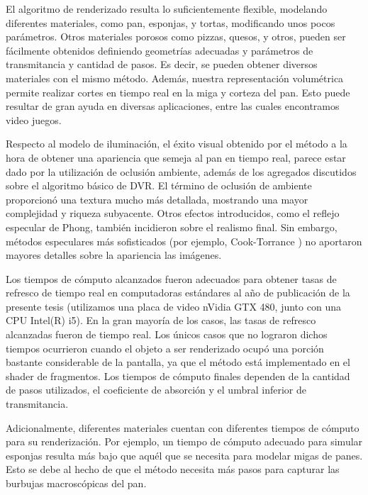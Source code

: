 El algoritmo de renderizado resulta lo suficientemente flexible, modelando diferentes materiales, como pan, esponjas, y tortas, modificando unos pocos parámetros.
Otros materiales porosos como pizzas, quesos, y otros, pueden ser fácilmente obtenidos definiendo geometrías adecuadas y parámetros de transmitancia y cantidad de pasos.
Es decir, se pueden obtener diversos materiales con el mismo método.
Además, nuestra representación volumétrica permite realizar cortes en tiempo real en la miga y corteza del pan.
Esto puede resultar de gran ayuda en diversas aplicaciones, entre las cuales encontramos video juegos.

Respecto al modelo de iluminación, el éxito visual obtenido por el método a la hora de obtener una apariencia que semeja al pan en tiempo real, parece estar dado por la utilización de oclusión ambiente, además de los agregados discutidos sobre el algoritmo básico de DVR.
El término de oclusión de ambiente proporcionó una textura mucho más detallada, mostrando una mayor complejidad y riqueza subyacente.
Otros efectos introducidos, como el reflejo especular de Phong, también incidieron sobre el realismo final.
Sin embargo, métodos especulares más sofisticados (por ejemplo, Cook-Torrance \cite{Cook1982}) no aportaron mayores detalles sobre la apariencia las imágenes.


Los tiempos de cómputo alcanzados fueron adecuados para obtener tasas de refresco de tiempo real en computadoras estándares al año de publicación de la presente tesis (utilizamos una placa de video nVidia GTX 480, junto con una \acrshort{CPU} Intel(R) i5).
En la gran mayoría de los casos, las tasas de refresco alcanzadas fueron de tiempo real.
Los únicos casos que no lograron dichos tiempos ocurrieron cuando el objeto a ser renderizado ocupó una porción bastante considerable de la pantalla, ya que el método está implementado en el shader de fragmentos.
Los tiempos de cómputo finales dependen de la cantidad de pasos utilizados, el coeficiente de absorción y el umbral inferior de transmitancia.

Adicionalmente, diferentes materiales cuentan con diferentes tiempos de cómputo para su renderización.
Por ejemplo, un tiempo de cómputo adecuado para simular esponjas resulta más bajo que aquél que se necesita para modelar migas de panes.
Esto se debe al hecho de que el método necesita más pasos para capturar las burbujas macroscópicas del pan.

